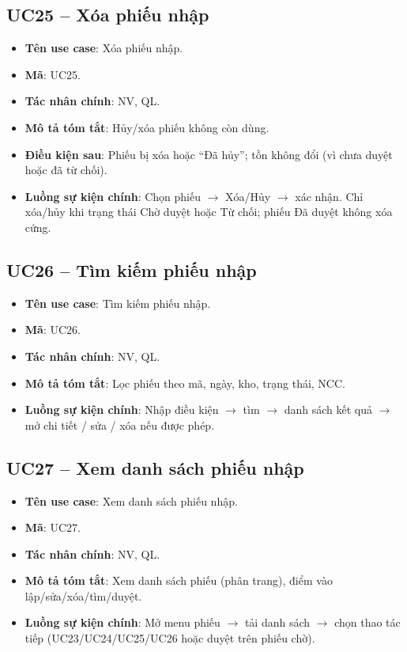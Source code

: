 \subsection{UC25 -- Xóa phiếu nhập}

\begin{itemize}[leftmargin=1.5cm]
    \item \textbf{Tên use case}: Xóa phiếu nhập.
    \item \textbf{Mã}: UC25.
    \item \textbf{Tác nhân chính}: NV, QL.
    \item \textbf{Mô tả tóm tắt}: Hủy/xóa phiếu không còn dùng.
    \item \textbf{Điều kiện sau}: Phiếu bị xóa hoặc ``Đã hủy''; tồn không đổi (vì chưa duyệt hoặc đã từ chối).
    \item \textbf{Luồng sự kiện chính}: Chọn phiếu $\rightarrow$ Xóa/Hủy $\rightarrow$ xác nhận. Chỉ xóa/hủy khi trạng thái Chờ duyệt hoặc Từ chối; phiếu Đã duyệt không xóa cứng.
\end{itemize}

\subsection{UC26 -- Tìm kiếm phiếu nhập}

\begin{itemize}[leftmargin=1.5cm]
    \item \textbf{Tên use case}: Tìm kiếm phiếu nhập.
    \item \textbf{Mã}: UC26.
    \item \textbf{Tác nhân chính}: NV, QL.
    \item \textbf{Mô tả tóm tắt}: Lọc phiếu theo mã, ngày, kho, trạng thái, NCC.
    \item \textbf{Luồng sự kiện chính}: Nhập điều kiện $\rightarrow$ tìm $\rightarrow$ danh sách kết quả $\rightarrow$ mở chi tiết / sửa / xóa nếu được phép.
\end{itemize}

\subsection{UC27 -- Xem danh sách phiếu nhập}

\begin{itemize}[leftmargin=1.5cm]
    \item \textbf{Tên use case}: Xem danh sách phiếu nhập.
    \item \textbf{Mã}: UC27.
    \item \textbf{Tác nhân chính}: NV, QL.
    \item \textbf{Mô tả tóm tắt}: Xem danh sách phiếu (phân trang), điểm vào lập/sửa/xóa/tìm/duyệt.
    \item \textbf{Luồng sự kiện chính}: Mở menu phiếu $\rightarrow$ tải danh sách $\rightarrow$ chọn thao tác tiếp (UC23/UC24/UC25/UC26 hoặc duyệt trên phiếu chờ).
\end{itemize}


